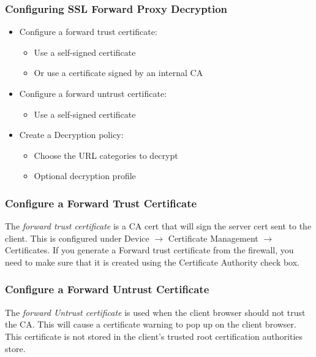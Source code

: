 \subsubsection{Configuring SSL Forward Proxy Decryption}
\begin{itemize}
    \item Configure a forward trust certificate:
        \begin{itemize}
            \item Use a self-signed certificate
            \item Or use a certificate signed by an internal CA
        \end{itemize}
    \item Configure a forward untrust certificate:
        \begin{itemize}
            \item Use a self-signed certificate
        \end{itemize}
    \item Create a Decryption policy:
        \begin{itemize}
            \item Choose the URL categories to decrypt
            \item Optional decryption profile
        \end{itemize}
\end{itemize}

\subsubsection{Configure a Forward Trust Certificate}
The \textit{forward trust certificate} is a CA cert that will sign the server cert sent to the client.
This is configured under Device $\rightarrow$ Certificate Management $\rightarrow$ Certificates.
If you generate a Forward trust certificate from the firewall, you need to make sure that it is created using the Certificate Authority check box.

\subsubsection{Configure a Forward Untrust Certificate}
The \textit{forward Untrust certificate} is used when the client browser should not trust the CA.
This will cause a certificate warning to pop up on the client browser. This certificate is not stored in the client's trusted root certification authorities store.

